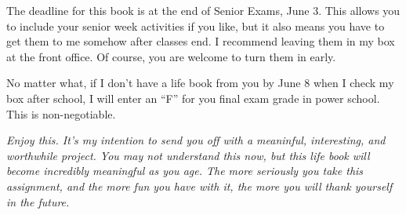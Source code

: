 \documentclass{article}
\begin{document}
  The deadline for this book is at the end of Senior Exams, June 3.
  This allows you to include your senior week activities if you
  like, but it also means you have to get them to me somehow after
  classes end. I recommend leaving them in my box at the front
  office. Of course, you are welcome to turn them in early.

  No matter what, if I don't have a life book from you by June 8 when
  I check my box after school, I will enter
  an ``F'' for you final exam grade in power school. This is
  non-negotiable.

\vfill

\noindent\emph{Enjoy this. It's my intention to send you off with a
  meaninful, interesting, and worthwhile project. You may not
  understand this now, but this life book will become incredibly
  meaningful as you age. The more seriously you take this assignment,
  and the more fun you have with it, the more you will thank yourself
  in the future.}
\end{document}
